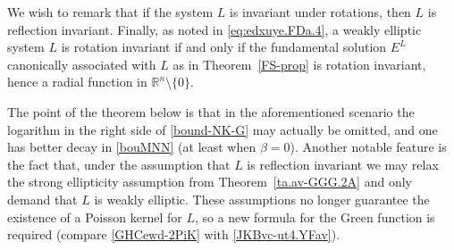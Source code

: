 \documentclass[11pt,reqno]{amsart}
\numberwithin{equation}{section}
\theoremstyle{remark}
\begin{document}
%
We wish to remark that if the system $L$ is invariant under rotations, then $L$ is reflection invariant.
Finally, as noted in \eqref{eq:edxuye.FDa.4}, a weakly elliptic system $L$ is rotation invariant if and only if 
the fundamental solution $E^L$ canonically associated with $L$ as in Theorem~\ref{FS-prop} 
is rotation invariant, hence a radial function in ${\mathbb{R}}^n\setminus\{0\}$.

The point of the theorem below is that in the aforementioned scenario 
the logarithm in the right side of \eqref{bound-NK-G} may actually be omitted, and one has better decay in \eqref{bouMNN}
(at least when $\beta=0$). Another notable feature is the fact that, under the assumption that $L$ is reflection invariant
we may relax the strong ellipticity assumption from Theorem~\ref{ta.av-GGG.2A} and only demand that $L$ is weakly elliptic.
These assumptions no longer guarantee the existence of a Poisson kernel for $L$, so a new formula for the Green function 
is required (compare \eqref{GHCewd-2PiK} with \eqref{JKBvc-ut4.YFav}). 
\end{document}
